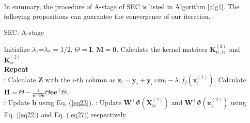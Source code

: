 \documentclass[10pt,journal,compsoc]{IEEEtran}
\begin{document}
In summary, the procedure of A-stage of SEC is listed in Algorithm \ref{alg1}. The following propositions can guarantee the convergence of our iteration.
\begin{algorithm}[!t]
\caption{SEC: A-stage}
\label{alg1}
\small{
\begin{algorithmic}
\STATE Initialize $\lambda_1$=$\lambda_2$ = 1/2, $\Theta = \mathbf{I}$, $\mathbf{M}=\mathbf{0}$. Calculate the kernel matrices $\mathbf{K}_{tr, te}^{(2)}$ and $\mathbf{K}_{tr}^{(2)}$. \\
\STATE  \textbf{Repeat} \\
: Calculate $\mathbf{Z}$ with the $i$-th column as $\mathbf{z}_i = \mathbf{y}_i+\mathbf{y}_i \circ \mathbf{m}_i-\lambda_1 f_j(\mathbf{x}_i^{(1)})$. Calculate $\mathbf{H} = \Theta -\frac{1}{\mathbf{e}^\top \Theta \mathbf{e}} \Theta \mathbf{e} \mathbf{e}^\top \Theta$.  \\
: Update $\mathbf{b}$ using Eq. (\ref{eq23}).
: Update $\mathbf{W}^\top \Phi(\mathbf{X}_{te}^{(2)})$ and $\mathbf{W}^\top \Phi(\mathbf{x}_i^{(2)})$ using Eq. (\ref{eq22}) and Eq. (\ref{eq27}) respectively.
\\

\end{algorithmic}}
\end{algorithm}
\end{document}
